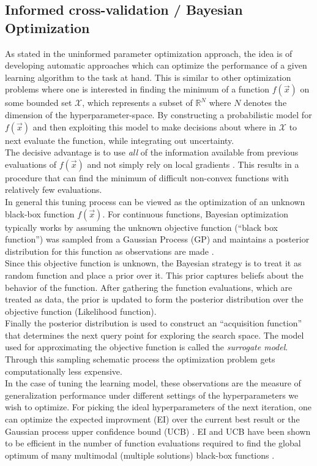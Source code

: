 \documentclass[12pt, a4paper]{article}
\begin{document}
\subsection{Informed cross-validation / Bayesian Optimization}
\label{sec: bayesian_opt}
As stated in the uninformed parameter optimization approach, the idea is of developing automatic approaches which can optimize the performance of a given learning algorithm to the task at hand. This is similar to other optimization problems where one is interested in finding the minimum of a function $f(\vec{x})$ on some bounded set $\mathcal{X}$, which represents a subset of $\mathbb{R}^N$ where $N$ denotes the dimension of the hyperparameter-space. By constructing a probabilistic model for $f(\vec{x})$ and then exploiting this model to make decisions about where in $\mathcal{X}$ to next evaluate the function, while integrating out uncertainty. \\
The decisive advantage is to use \textit{all} of the information available from previous evaluations of $f(\vec{x})$ and not simply rely on local gradients \cite{Snoek2012}. This results in a procedure that can find the minimum of difficult non-convex functions with relatively few evaluations. \\
In general this tuning process can be viewed as the optimization of an unknown black-box function $f(\vec{x})$. For continuous functions, Bayesian optimization typically works by assuming the unknown objective function (``black box function'') was sampled from a Gaussian Process (GP) and maintains a posterior distribution for this function as observations are made \cite{Frazier2018}. \\
Since this objective function is unknown, the Bayesian strategy is to treat it as random function and place a prior over it. This prior captures beliefs about the behavior of the function. After gathering the function evaluations, which are treated as data, the prior is updated to form the posterior distribution over the objective function (Likelihood function). \\
Finally the posterior distribution is used to construct an ``acquisition function'' that determines the next query point for exploring the search space. The model used for approximating the objective function is called the \textit{surrogate model}.
Through this sampling schematic process the optimization problem gets computationally less expensive. \\
In the case of tuning the learning model, these observations are the measure of generalization performance under different settings of the hyperparameters we wish to optimize. For picking the ideal hyperparameters of the next iteration, one can optimize the expected improvment (EI) \cite{Mockus} over the current best result or the Gaussian process upper confidence bound (UCB) \cite{Srinivas2009}. EI and UCB have been shown to be efficient in the number of function evaluations required to find the global optimum of many multimodal (multiple solutions) black-box functions \cite{Srinivas2009, Snoek2012}.
\end{document}
